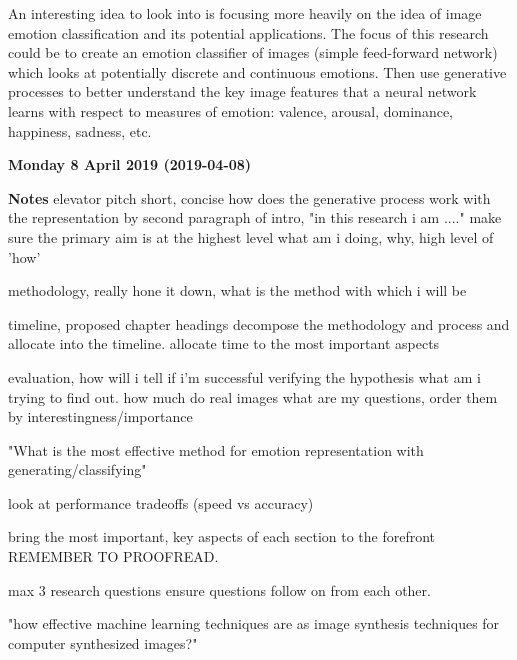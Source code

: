 \documentclass[10pt,a4paper]{article}
\begin{document}
	An interesting idea to look into is focusing more heavily on the idea of image emotion classification and its potential applications.
	The focus of this research could be to create an emotion classifier of images (simple feed-forward network) which looks at potentially discrete and continuous emotions. Then use generative processes to better understand the key image features that a neural network learns with respect to measures of emotion: valence, arousal, dominance, happiness, sadness, etc.
	
	\begin{center} \textbf{Monday 8 April 2019 (2019-04-08)} \end{center} 
	
	\textbf{Notes}
	elevator pitch
	short, concise
	how does the generative process work with the representation
	by second paragraph of intro, "in this research i am ...."
	make sure the primary aim is at the highest level
	what am i doing, why, high level of 'how'
	
	methodology, really hone it down, what is the method with which i will be 
	
	timeline, proposed chapter headings
	decompose the methodology and process and allocate into the timeline.
	allocate time to the most important aspects
	
	evaluation, how will i tell if i'm successful
	verifying the hypothesis
	what am i trying to find out.
	how much do real images
	what are my questions, order them by interestingness/importance
	
	"What is the most effective method for emotion representation with generating/classifying"
	
	look at performance tradeoffs (speed vs accuracy)
	
	bring the most important, key aspects of each section to the forefront
	REMEMBER TO PROOFREAD.
	
	max 3 research questions
	ensure questions follow on from each other.
	
	"how effective machine learning techniques are as image synthesis techniques for computer synthesized images?"
	
	
	
	
\end{document}
